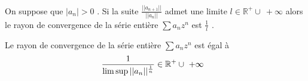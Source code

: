 %
%
%
\begin{thm}
 On suppose que $|a_n| > 0$ . Si la suite
   $\frac{||a_{n+1}||}{||a_n||}$ admet
 une limite  $l \in \mathbb{R}^{+}  \cup\ +  \infty$ alors le  rayon de
 convergence de la série entière $\sum a_n z^n$ est $\frac{1}{ l}$ .

\end{thm}

%
%
%
\begin{thm}
  Le rayon de convergence de la série entière $\sum a_n z^n$ est égal à
\[
\frac{1}{\limsup ||a_n||^{1 \over n}} \in \mathbb{R}^+ \cup\ + \infty~\
\]
\end{thm}

